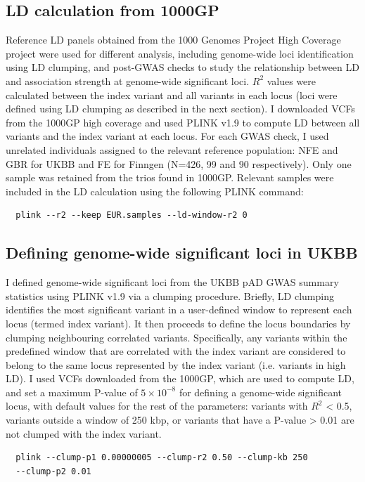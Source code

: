 \subsection{LD calculation from 1000GP}
Reference LD panels obtained from the 1000 Genomes Project High Coverage project \cite{1000gphc} were used for different analysis, including genome-wide loci identification using LD clumping, and post-GWAS checks to study the relationship between LD and association strength at genome-wide significant loci. $R^{2}$ values were calculated between the index variant and all variants in each locus (loci were defined using LD clumping as described in the next section). I downloaded VCFs from the 1000GP high coverage and used PLINK v1.9 to compute LD between all variants and the index variant at each locus. For each GWAS check, I used unrelated individuals assigned to the relevant reference population: NFE and GBR for UKBB and FE for Finngen (N=426, 99 and 90 respectively). Only one sample was retained from the trios found in 1000GP. Relevant samples were included in the LD calculation using the following PLINK command:
\begin{verbatim}
  plink --r2 --keep EUR.samples --ld-window-r2 0 
\end{verbatim}

\subsection{Defining genome-wide significant loci in UKBB}
I defined genome-wide significant loci from the UKBB pAD GWAS summary statistics using PLINK v1.9 via a clumping procedure. Briefly, LD clumping identifies the most significant variant in a user-defined window to represent each locus (termed index variant). It then proceeds to define the locus boundaries by clumping neighbouring correlated variants. Specifically, any variants within the predefined window that are correlated with the index variant are considered to belong to the same locus represented by the index variant (i.e. variants in high LD). I used VCFs downloaded from the 1000GP, which are used to compute LD, and set a maximum P-value of $5\times10^{-8}$ for defining a genome-wide significant locus, with default values for the rest of the parameters: variants with $R^{2}$ < 0.5, variants outside a window of 250 kbp, or variants that have a P-value > 0.01 are not clumped with the index variant.
\begin{verbatim}
  plink --clump-p1 0.00000005 --clump-r2 0.50 --clump-kb 250 
  --clump-p2 0.01
\end{verbatim}

